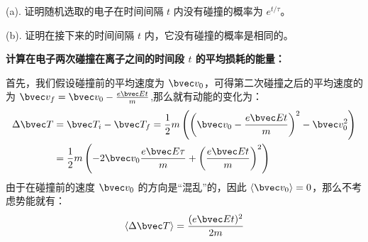 \begin{example}{}
(a). 证明随机选取的电子在时间间隔 $t$ 内没有碰撞的概率为 $e^{t/\tau}$。

(b). 证明在接下来的时间间隔 $t$ 内，它没有碰撞的概率是相同的。
\end{example}
\begin{example}{}
\textbf{计算在电子两次碰撞在离子之间的时间段 $t$ 的平均损耗的能量：}

首先，我们假设碰撞前的平均速度为 $\bvec v_0$，可得第二次碰撞之后的平均速度的为 $\bvec v_f=\bvec v_0 -\frac{e\bvec E t}{m}$,那么就有动能的变化为：
\begin{align}
\Delta \bvec T &= \bvec T_i-\bvec T_f=\frac{1}{2}m\left(\left(\bvec v_0 -\frac{e\bvec E t}{m}\right)^2-\bvec v_0^2\right)\\
&=\frac{1}{2}m\left(-2\bvec v_0\frac{e\bvec E \tau}{m}+\left(\frac{e\bvec E t}{m}\right)^2\right)\\
\end{align}
由于在碰撞前的速度 $\bvec v_0$ 的方向是“混乱”的，因此 $\langle \bvec v_0\rangle = 0$，那么不考虑势能就有：
\begin{equation}
\langle \Delta \bvec T \rangle = \frac{(e\bvec E t)^2}{2m}
\end{equation}
\end{example}
